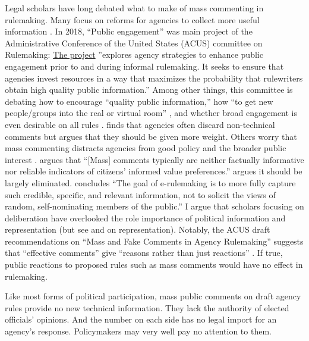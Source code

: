 Legal scholars have long debated what to make of mass commenting in rulemaking. Many focus on reforms for agencies to collect more useful information \citep{Farina2011, Farina2014, Rauch2016}. In 2018, ``Public engagement'' was main project of the Administrative Conference of the United States (ACUS) committee on Rulemaking: \href{https://www.acus.gov/research-projects/public-engagement-rulemaking}{The project} ''explores agency strategies to enhance public engagement prior to and during informal rulemaking. It seeks to ensure that agencies invest resources in a way that maximizes the probability that rulewriters obtain high quality public information.''  Among other things, this committee is debating how to encourage ``quality public information,'' how ``to get new people/groups into the real or virtual room'' \citep{Farina2018}, and whether broad engagement is even desirable on all rules \citep{White2018}. \citet{Mendelson2011} finds that agencies often discard non-technical comments but argues that they should be given more weight. Others worry that mass commenting distracts agencies from good policy and the broader public interest \citep{Coglianese2006}. \citet[p. 112]{Farina2012} argues that ``[Mass] comments typically are neither factually informative nor reliable indicators of citizens’ informed value preferences.'' \citet{Rossi1997} argues it should be largely eliminated. \citet[p. 208]{Herz2016} concludes ``The goal of e-rulemaking is to more fully capture such credible, specific, and relevant information, not to solicit the views of random, self-nominating members of the public.'' I argue that scholars focusing on deliberation have overlooked the role importance of political information and representation (but see \citet{Reich1966} and \citet{Seifter2016UCLA} on representation).
Notably, the ACUS draft recommendations on ``Mass and Fake Comments in Agency Rulemaking'' suggests that ``effective comments'' give ``reasons rather than just reactions'' \citep[p. 33]{ACUS2018}. If true, public reactions to proposed rules such as mass comments would have no effect in rulemaking. 

Like most forms of political participation, 
mass public comments on draft agency rules provide no new technical information. 
They lack the authority of elected officials' opinions. 
And the number on each side has no legal import for an agency's response.
Policymakers may very well pay no attention to them. 

